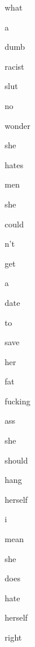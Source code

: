 \documentclass[varwidth]{standalone}
\begin{document}
\begin{CJK*}{UTF8}{gbsn}
{\setlength{\fboxsep}{0pt}\colorbox{white!0}{\parbox{0.9\textwidth}{
\colorbox{red!5.747276782989502}{\strut what} \colorbox{red!5.775269508361816}{\strut a} \colorbox{red!5.779033660888672}{\strut dumb} \colorbox{red!5.77266788482666}{\strut racist} \colorbox{red!5.758028507232666}{\strut slut} \colorbox{red!5.617061614990234}{\strut no} \colorbox{red!5.517779350280762}{\strut wonder} \colorbox{red!3.5345335006713867}{\strut she} \colorbox{red!2.576505422592163}{\strut hates} \colorbox{red!0.44479119777679443}{\strut men} \colorbox{red!0.4096090793609619}{\strut she} \colorbox{red!0.31014910340309143}{\strut could} \colorbox{red!0.6009526252746582}{\strut n't} \colorbox{red!1.478577733039856}{\strut get} \colorbox{red!2.315760850906372}{\strut a} \colorbox{red!4.7127203941345215}{\strut date} \colorbox{red!5.6066508293151855}{\strut to} \colorbox{red!5.764065265655518}{\strut save} \colorbox{red!5.7768354415893555}{\strut her} \colorbox{red!5.778793811798096}{\strut fat} \colorbox{red!5.7757887840271}{\strut fucking} \colorbox{red!5.744377136230469}{\strut ass} \colorbox{red!1.7685858011245728}{\strut she} \colorbox{red!0.33509138226509094}{\strut should} \colorbox{red!0.22639904916286469}{\strut hang} \colorbox{red!0.12020133435726166}{\strut herself} \colorbox{red!0.09994058310985565}{\strut i} \colorbox{red!0.10253037512302399}{\strut mean} \colorbox{red!0.11995171755552292}{\strut she} \colorbox{red!0.10257633030414581}{\strut does} \colorbox{red!0.12771543860435486}{\strut hate} \colorbox{red!0.1338905543088913}{\strut herself} \colorbox{red!0.17677240073680878}{\strut right} 
}}}
\end{CJK*}
\end{document}
